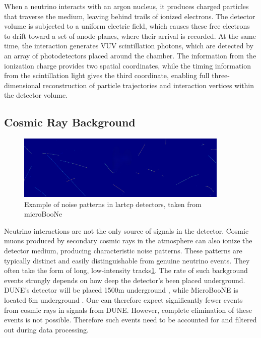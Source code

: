 \documentclass{pracalicmgr}
\begin{document}
When a neutrino interacts with an argon nucleus, it produces charged particles that traverse the medium, leaving behind trails of ionized electrons. The detector volume is subjected to a uniform electric field, which causes these free electrons to drift toward a set of anode planes, where their arrival is recorded. At the same time, the interaction generates VUV scintillation photons, which are detected by an array of photodetectors placed around the chamber. The information from the ionization charge provides two spatial coordinates, while the timing information from the scintillation light gives the third coordinate, enabling full three-dimensional reconstruction of particle trajectories and interaction vertices within the detector volume.

\subsection{Cosmic Ray Background}

\begin{figure}[H]
    \centering
    \includegraphics[width=0.9\textwidth]{src/wireimageIM.png}
    \caption{Example of noise patterns in lartcp detectors, taken from microBooNe \cite{ubooneOpenSamples}}
    \label{fig:noise}
\end{figure}

Neutrino interactions are not the only source of signals in the detector. Cosmic muons produced by secondary cosmic rays in the atmosphere can also ionize the detector medium, producing characteristic noise patterns. These patterns are typically distinct and easily distinguishable from genuine neutrino events. They often take the form of long, low-intensity tracks\ref{fig:noise}. The rate of such background events strongly depends on how deep the detector's been placed underground. DUNE's detector will be placed 1500m underground \cite{DUNE}, while MicroBooNE is located 6m underground \cite{MicroBooNEDesign}. One can therefore expect significantly fewer events from cosmic rays in signals from DUNE. However, complete elimination of these events is not possible. Therefore such events need to be accounted for and filtered out during data processing.
\end{document}
